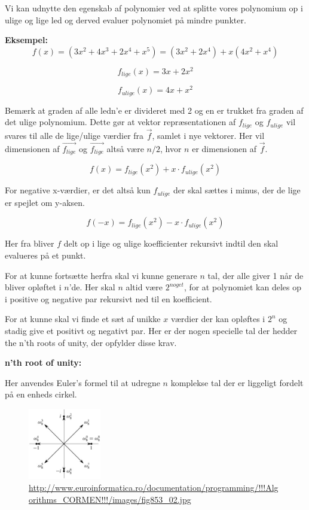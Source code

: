 \documentclass[11pt,a4paper]{article}
\begin{document}
Vi kan udnytte den egenskab af polynomier ved at splitte vores polynomium op i ulige og lige led
og derved evaluer polynomiet på mindre punkter.

\textbf{Eksempel:}
$$
f(x) = (3x^2 + 4x^3 + 2x^4 + x^5) = (3x^2 + 2x^4) + x(4x^2 + x^4)
$$

$$
f_{lige}(x) = 3x + 2x^2
$$

$$
f_{ulige}(x) = 4x + x^2
$$

Bemærk at graden af alle ledn'e er divideret med 2 og en er trukket fra graden af det ulige polynomium.
Dette gør at vektor repræsentationen af \(f_{lige}\) og \(f_{ulige}\) vil svares til alle de lige/ulige værdier fra \(\vec{f}\),
samlet i nye vektorer. Her vil dimensionen af \({\vec{f_{lige}}}\) og \({\vec{f_{lige}}}\) altså være \(n/2\), hvor \(n\) er dimensionen af \(\vec{f}\).

$$
f(x) = f_{lige}(x^2) + x \cdot f_{ulige}(x^2)
$$

For negative x-værdier, er det altså kun \(f_{ulige}\) der skal sættes i minus,
der de lige er spejlet om y-aksen.

$$
f(-x) = f_{lige}(x^2) - x \cdot f_{ulige}(x^2)
$$

Her fra bliver \(f\) delt op i lige og ulige koefficienter rekursivt indtil den skal evalueres på et punkt.

For at kunne fortsætte herfra skal vi kunne generare \(n\) tal, der alle giver 1 når de bliver opløftet i \(n\)'de.
Her skal \(n\) altid være \(2^{noget}\), for at polynomiet kan deles op i positive og negative par rekursivt ned til en koefficient.

For at kunne skal vi finde et sæt af unikke \(x\) værdier der kan opløftes i \(2^n\) og stadig give et positivt og negativt par.
Her er der nogen specielle tal der hedder the n'th roots of unity, der opfylder disse krav.

\bigskip

\textbf{n'th root of unity:}

Her anvendes Euler's formel til at udregne \(n\) komplekse tal der er liggeligt fordelt på en enheds cirkel.

\begin{figure}[htbp]
\centering
\includegraphics[width=120]{./nth_root_of_unity.jpg}
\caption{\url{http://www.euroinformatica.ro/documentation/programming/!!!Algorithms\_CORMEN!!!/images/fig853\_02.jpg}}
\end{figure}
\end{document}
